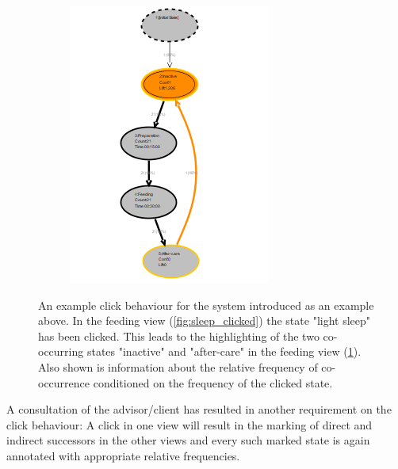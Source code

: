 \documentclass[12pt]{extarticle}
\begin{document}
\begin{figure}[H]
\begin{subfigure}[b]{0.45\textwidth}
        \includegraphics[width=\textwidth]{../Diagrams/feeding_marked.png}
        \caption{}
        \label{fig:feed_marked}
    \end{subfigure}
    \caption{An example click behaviour for the system introduced as an example above. In the feeding view (\ref{fig:sleep_clicked}) the state "light sleep" has been clicked. This leads to the highlighting of the two co-occurring states "inactive" and "after-care" in the feeding view (\ref{fig:feed_marked}). Also shown is information about the relative frequency of co-occurrence conditioned on the frequency of the clicked state.}
    \label{fig:exampleclick}
\end{figure}

A consultation of the advisor/client has resulted in another requirement on the click behaviour: A click in one view will result in the marking of direct and indirect successors in the other views and every such marked state is again annotated with appropriate relative frequencies.
\end{document}
